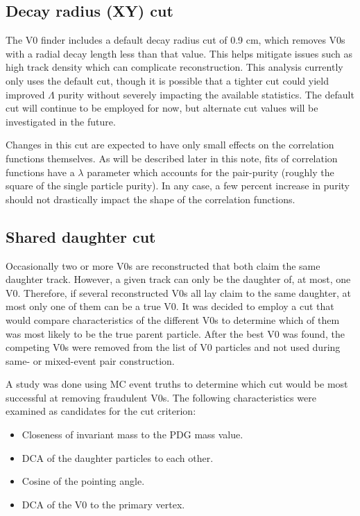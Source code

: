 \subsection{Decay radius (XY) cut}
The V0 finder includes a default decay radius cut of 0.9 cm, which removes V0s with a radial decay length less than that value.  This helps mitigate issues such as high track density which can complicate reconstruction.  This analysis currently only uses the default cut, though it is possible that a tighter cut could yield improved $\Lambda$ purity without severely impacting the available statistics.  The default cut will continue to be employed for now, but alternate cut values will be investigated in the future.  

Changes in this cut are expected to have only small effects on the correlation functions themselves.  As will be described later in this note, fits of correlation functions have a $\lambda$ parameter which accounts for the pair-purity (roughly the square of the single particle purity).  In any case, a few percent increase in purity should not drastically impact the shape of the correlation functions.


\subsection{Shared daughter cut}

Occasionally two or more V0s are reconstructed that both claim the same daughter track.  However, a given track can only be the daughter of, at most, one V0.  Therefore, if several reconstructed V0s all lay claim to the same daughter, at most only one of them can be a true V0.  It was decided to employ a cut that would compare characteristics of the different V0s to determine which of them was most likely to be the true parent particle.  After the best V0 was found, the competing V0s were removed from the list of V0 particles and not used during same- or mixed-event pair construction.

A study was done using MC event truths to determine which cut would be most successful at removing fraudulent V0s.  The following characteristics were examined as candidates for the cut criterion:

\begin{itemize}
\item Closeness of invariant mass to the PDG mass value.
\item DCA of the daughter particles to each other.
\item Cosine of the pointing angle.
\item DCA of the V0 to the primary vertex.
\end{itemize}

